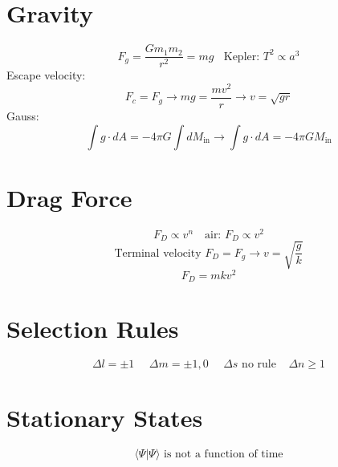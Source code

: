 \documentclass[10pt,a4paper]{article}
\begin{document}
\section{Gravity} %
\label{sec:gravity}
\begin{equation}
    F_g = \frac{Gm_1m_2}{r^2} = mg~~~~ \textrm{Kepler: }T^2 \propto a^3
\end{equation}
Escape velocity:
\begin{equation}
    F_c = F_g \rightarrow mg = \frac{mv^2}{r} \rightarrow v = \sqrt{gr}
\end{equation}
Gauss:
\begin{equation}
    \int g \cdot dA = -4\pi G \int dM_{\textrm{in}} \rightarrow \int g \cdot dA = -4 \pi GM_{\textrm{in}}
\end{equation}

\section{Drag Force} %
\label{sec:drag_force}
\begin{equation}
    F_D \propto v^n~~~\textrm{ air: }F_D \propto v^2
\end{equation}
\begin{equation}
    \textrm{Terminal velocity }F_D = F_g \rightarrow v = \sqrt{\frac{g}{k}}
\end{equation}
\begin{equation}
    F_D = mkv^2
\end{equation}

\section{Selection Rules} %
\label{sec:selection_rules}
\begin{equation}
    \Delta l = \pm 1 ~~~~~~  \Delta m = \pm 1,0 ~~~~~~ \Delta s \textrm{ no rule}~~~~~ \Delta n \geq 1
\end{equation}

\section{Stationary States} %
\label{sec:stationary_states}
\begin{equation}
    \langle \Psi | \Psi \rangle \textrm{ is not a function of time}
\end{equation}
\end{document}

